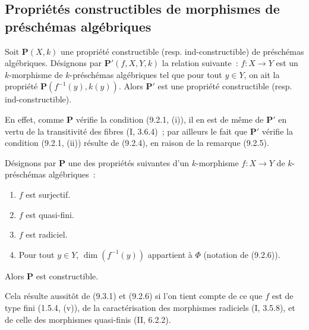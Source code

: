 \subsection{Propriétés constructibles de morphismes de préschémas algébriques}

\begin{proposition}[9.3.1]
\label{IV.9.3.1-fr}
Soit $\mathbf P(X,k)$ une propriété constructible (resp. ind-constructible)
de préschémas algébriques. Désignons par $\mathbf P'(f,X,Y,k)$ la relation
suivante~: $f:X\to Y$ est un $k$-morphisme de $k$-préschémas algébriques tel
que pour tout $y\in Y$, on ait la propriété
$\mathbf P(f^{-1}(y),k(y))$. Alors $\mathbf P'$ est une propriété
constructible (resp. ind-constructible).
\end{proposition}

En effet, comme $\mathbf P$ vérifie la condition (9.2.1, (i)), il en est de
même de $\mathbf P'$ en vertu de la transitivité des fibres (I, 3.6.4)~; par
ailleurs le fait que $\mathbf P'$ vérifie la condition (9.2.1, (ii)) résulte
de (9.2.4), en raison de la remarque (9.2.5).

\begin{proposition}[9.3.2]
\label{IV.9.3.2-fr}
Désignons par $\mathbf P$ une des propriétés suivantes d'un $k$-morphisme
$f:X\to Y$ de $k$-préschémas algébriques~:
\begin{enumerate}[label=(\roman*)]
  \item $f$ est surjectif.
  \item $f$ est quasi-fini.
  \item $f$ est radiciel.
  \item Pour tout $y\in Y$, $\dim(f^{-1}(y))$ appartient à $\Phi$ (notation
  de (9.2.6)).
\end{enumerate}
Alors $\mathbf P$ est constructible.
\end{proposition}

Cela résulte aussitôt de (9.3.1) et (9.2.6) si l'on tient compte de ce que $f$
est de type fini (1.5.4, (v)), de la caractérisation des morphismes radiciels
(I, 3.5.8), et de celle des morphismes quasi-finis (II, 6.2.2).

